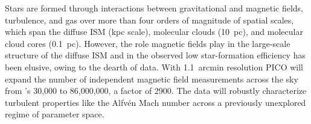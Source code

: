 \documentclass[PICOAPC.tex]{subfiles}
\begin{document}
Stars are formed through interactions between gravitational and magnetic fields, turbulence, and gas over more than four orders of magnitude of spatial scales, which span the diffuse ISM (kpc scale), molecular clouds (10~pc), and molecular cloud cores (0.1~pc). However, the role magnetic fields play in the large-scale structure of the diffuse \ac{ISM} and in the observed low star-formation efficiency has been elusive, owing to the dearth of data. 
With 1.1~arcmin resolution PICO will expand the number of independent magnetic field measurements across the sky from \planck 's  30,000 to 86,000,000, a factor of 2900. The data will robustly characterize turbulent properties like the Alfv\'{e}n Mach number across a previously unexplored regime of parameter space. 
\end{document}

